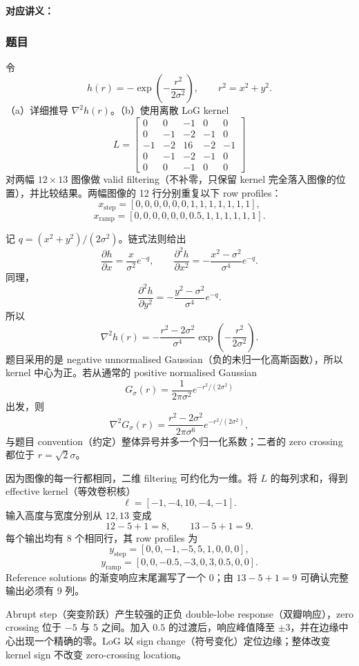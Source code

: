 
\textbf{对应讲义：}

\subsubsection*{题目}

令
\[
  h(r)=-\exp\!\left(-\frac{r^2}{2\sigma^2}\right),
  \qquad r^2=x^2+y^2.
\]
（a）详细推导 $\nabla^2h(r)$。（b）使用离散 LoG kernel
\[
  L=\begin{bmatrix}
    0&0&-1&0&0\\
    0&-1&-2&-1&0\\
    -1&-2&16&-2&-1\\
    0&-1&-2&-1&0\\
    0&0&-1&0&0
  \end{bmatrix}
\]
对两幅 $12\times13$ 图像做 valid filtering（不补零，只保留 kernel 完全落入图像的位置），并比较结果。两幅图像的 12 行分别重复以下 row profiles：
\[
  x_{\mathrm{step}}=
  [0,0,0,0,0,0,1,1,1,1,1,1,1],
\]
\[
  x_{\mathrm{ramp}}=
  [0,0,0,0,0,0,0.5,1,1,1,1,1,1].
\]

\begin{checkedsolution}
记 $q=(x^2+y^2)/(2\sigma^2)$。链式法则给出
\[
  \frac{\partial h}{\partial x}
  =\frac{x}{\sigma^2}e^{-q},\qquad
  \frac{\partial^2h}{\partial x^2}
  =-\frac{x^2-\sigma^2}{\sigma^4}e^{-q}.
\]
同理，
\[
  \frac{\partial^2h}{\partial y^2}
  =-\frac{y^2-\sigma^2}{\sigma^4}e^{-q}.
\]
所以
\[
  \boxed{
  \nabla^2h(r)
  =-\frac{r^2-2\sigma^2}{\sigma^4}
  \exp\!\left(-\frac{r^2}{2\sigma^2}\right)}.
\]
题目采用的是 negative unnormalised Gaussian（负的未归一化高斯函数），所以 kernel 中心为正。若从通常的 positive normalised Gaussian
\[
  G_\sigma(r)=\frac{1}{2\pi\sigma^2}
  e^{-r^2/(2\sigma^2)}
\]
出发，则
\[
  \nabla^2G_\sigma(r)
  =\frac{r^2-2\sigma^2}{2\pi\sigma^6}
  e^{-r^2/(2\sigma^2)},
\]
与题目 convention（约定）整体异号并多一个归一化系数；二者的 zero crossing 都位于 $r=\sqrt2\sigma$。

因为图像的每一行都相同，二维 filtering 可约化为一维。将 $L$ 的每列求和，得到 effective kernel（等效卷积核）
\[
  \ell=[-1,-4,10,-4,-1].
\]
输入高度与宽度分别从 $12,13$ 变成
\[
  12-5+1=8,\qquad 13-5+1=9.
\]
每个输出均有 8 个相同行，其 row profiles 为
\[
  \boxed{y_{\mathrm{step}}
  =[0,0,-1,-5,5,1,0,0,0]},
\]
\[
  \boxed{y_{\mathrm{ramp}}
  =[0,0,-0.5,-3,0,3,0.5,0,0]}.
\]
Reference solutions 的渐变响应末尾漏写了一个 $0$；由 $13-5+1=9$ 可确认完整输出必须有 9 列。

Abrupt step（突变阶跃）产生较强的正负 double-lobe response（双瓣响应），zero crossing 位于 $-5$ 与 $5$ 之间。加入 $0.5$ 的过渡后，响应峰值降至 $\pm3$，并在边缘中心出现一个精确的零。LoG 以 sign change（符号变化）定位边缘；整体改变 kernel sign 不改变 zero-crossing location。
\end{checkedsolution}

